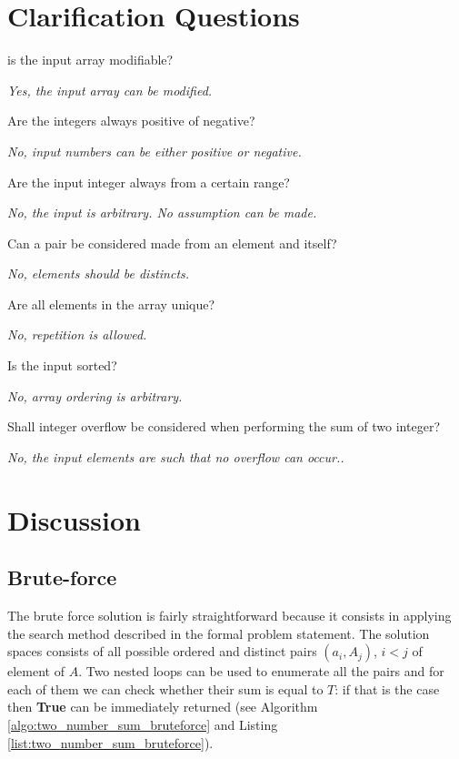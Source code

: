 \section{Clarification Questions}
\begin{QandA}
	\item is the input array modifiable?
	\begin{answered}
		\textit{Yes, the input array can be modified.}
	\end{answered}
	
	\item Are the integers always positive of negative?  
	\begin{answered}
		\textit{No, input numbers can be either positive or negative.}
	\end{answered}
	\item Are the input integer always from a certain range?
	\begin{answered}
		\textit{No, the input is arbitrary. No assumption can be made.}
	\end{answered}
	\item Can a pair be considered made from an element and itself?
	\begin{answered}
		\textit{No, elements should be distincts.}
	\end{answered}
	\item Are all elements in the array unique?
	\begin{answered}
		\textit{No, repetition is allowed.}
	\end{answered}
	\item Is the input sorted?
	\begin{answered}
		\textit{No, array ordering is arbitrary.}
	\end{answered}
	\item Shall integer overflow be considered when performing the sum of two integer? 
	\begin{answered}
		\textit{No, the input elements are such that no overflow can occur..}
	\end{answered}
\end{QandA}


\section{Discussion}

\subsection{Brute-force}
\label{sec:two_numbers:bruteforce}
The brute force solution is fairly straightforward because it consists in applying the search method
described in the formal problem statement. The solution spaces consists of all possible ordered and
distinct pairs $(a_i,A_j)$, $i < j$ of element of $A$. Two nested loops can be used to enumerate all
the pairs and for each of them we can check whether their sum is equal to $T$: if that is the case
then   \textbf{True} can be immediately returned (see Algorithm \ref{algo:two_number_sum_bruteforce}
and Listing \ref{list:two_number_sum_bruteforce}).

